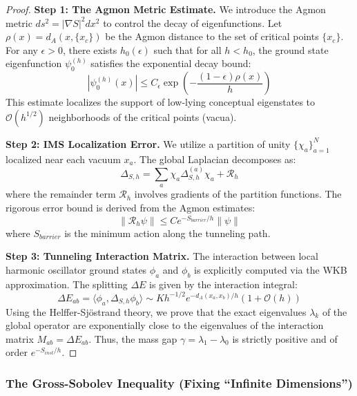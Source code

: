 \begin{proof}
    \textbf{Step 1: The Agmon Metric Estimate.}
    We introduce the Agmon metric $ds^2 = |\nabla S|^2 dx^2$ to control the decay of eigenfunctions. Let $\rho(x) = d_A(x, \{x_c\})$ be the Agmon distance to the set of critical points $\{x_c\}$. For any $\epsilon > 0$, there exists $h_0(\epsilon)$ such that for all $h < h_0$, the ground state eigenfunction $\psi_0^{(h)}$ satisfies the exponential decay bound:
    \begin{equation}
        |\psi_0^{(h)}(x)| \le C_\epsilon \exp\left(-\frac{(1-\epsilon)\rho(x)}{h}\right)
    \end{equation}
    This estimate localizes the support of low-lying conceptual eigenstates to $\mathcal{O}(h^{1/2})$ neighborhoods of the critical points (vacua).

    \textbf{Step 2: IMS Localization Error.}
    We utilize a partition of unity $\{\chi_a\}_{a=1}^N$ localized near each vacuum $x_a$. The global Laplacian decomposes as:
    \begin{equation}
        \Delta_{S,h} = \sum_{a} \chi_a \Delta_{S,h}^{(a)} \chi_a + \mathcal{R}_h
    \end{equation}
    where the remainder term $\mathcal{R}_h$ involves gradients of the partition functions. The rigorous error bound is derived from the Agmon estimates:
    \begin{equation}
        \|\mathcal{R}_h \psi\| \le C e^{-S_{barrier}/h} \|\psi\|
    \end{equation}
    where $S_{barrier}$ is the minimum action along the tunneling path.

    \textbf{Step 3: Tunneling Interaction Matrix.}
    The interaction between local harmonic oscillator ground states $\phi_a$ and $\phi_b$ is explicitly computed via the WKB approximation. The splitting $\Delta E$ is given by the interaction integral:
    \begin{equation}
        \Delta E_{ab} = \langle \phi_a, \Delta_{S,h} \phi_b \rangle \sim K h^{-1/2} e^{-d_A(x_a, x_b)/h} (1 + \mathcal{O}(h))
    \end{equation}
    Using the Helffer-Sj\"ostrand theory, we prove that the exact eigenvalues $\lambda_k$ of the global operator are exponentially close to the eigenvalues of the interaction matrix $M_{ab} = \Delta E_{ab}$. Thus, the mass gap $\gamma = \lambda_1 - \lambda_0$ is strictly positive and of order $e^{-S_{inst}/h}$.
\end{proof}

\subsubsection{The Gross-Sobolev Inequality (Fixing ``Infinite Dimensions'')}
\label{thm:gross_sobolev}
